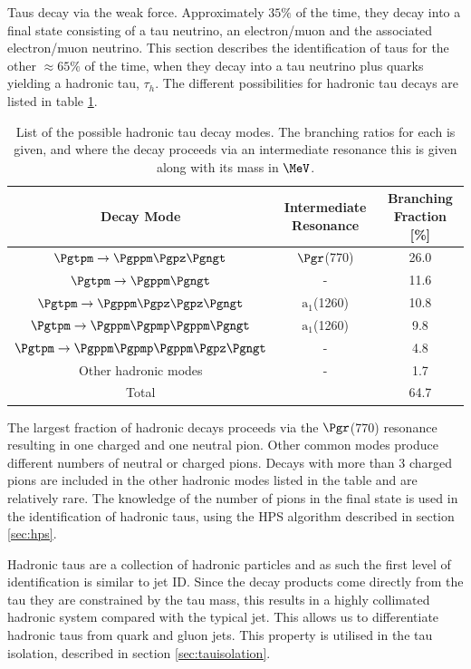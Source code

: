 Taus decay via the weak force. Approximately $35\%$ of the time, they decay into a final state consisting of a tau
neutrino, an electron/muon and the associated electron/muon neutrino. 
This section describes the identification of taus for the other $\approx65\%$ of the time,
when they decay into a tau neutrino plus quarks yielding a hadronic tau, $\tau_{h}$. The different
possibilities for hadronic tau decays are listed in table \ref{tab:hadronictaus}.

\begin{table}[bth]
\begin{tabular}{|c|c|c|}
\hline
Decay Mode & Intermediate Resonance & Branching Fraction [\%] \\
\hline
\hline
$\Pgtpm\to\Pgppm\Pgpz\Pgngt$ & $\Pgr$(770) & 26.0 \\
\hline
$\Pgtpm\to\Pgppm\Pgngt$ & -  & 11.6 \\
\hline
$\Pgtpm\to\Pgppm\Pgpz\Pgpz\Pgngt$ & $\text{a}_{1}$(1260) & 10.8 \\
\hline
$\Pgtpm\to\Pgppm\Pgpmp\Pgppm\Pgngt$ & $\text{a}_{1}$(1260) & 9.8 \\
\hline
$\Pgtpm\to\Pgppm\Pgpmp\Pgppm\Pgpz\Pgngt$ & -  & 4.8 \\
\hline
Other hadronic modes & - & 1.7 \\
\hline
\hline
Total & &  64.7 \\
\hline
\end{tabular}
\caption{List of the possible hadronic tau decay modes. The branching ratios for
each is given, and where the decay proceeds via an intermediate resonance this
is given along with its mass in $\MeV$\cite{PDG}.}
\label{tab:hadronictaus}
\end{table}

The largest fraction of hadronic decays proceeds via the $\Pgr$(770) resonance
resulting in one charged and one neutral pion. Other common modes produce
different numbers of neutral or charged pions. Decays with more than 3 charged
pions are included in the other hadronic modes listed in the table and are
relatively rare. The knowledge of the number of pions in the final state is used in the
identification of hadronic taus, using the \ac{HPS} algorithm
described in section \ref{sec:hps}.

Hadronic taus are a collection of hadronic particles and as such the first level
of identification is similar to jet ID. 
Since the decay products come directly from the tau they are constrained by the
tau mass, this results in a highly collimated hadronic system compared with the
typical jet. This allows us to differentiate hadronic taus from
quark and gluon jets. This property is utilised in the tau isolation,
described in section \ref{sec:tauisolation}.


